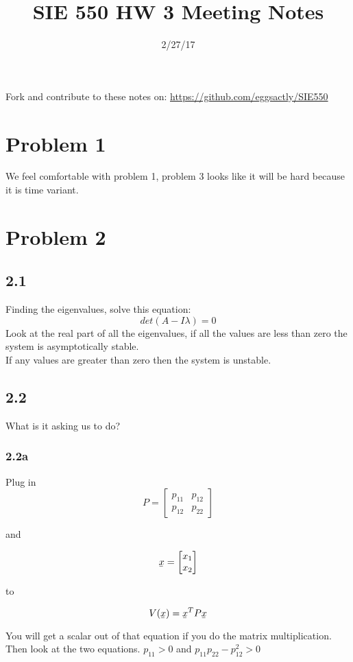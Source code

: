 \documentclass[12pt]{article}
\newcommand{\ubar}[1]{\underaccent{\bar}{#1}}
\begin{document}
\title{SIE 550 HW 3 Meeting Notes}
\date{2/27/17}

\maketitle

Fork and contribute to these notes on: \url{https://github.com/eggsactly/SIE550}

\section*{Problem 1} 
We feel comfortable with problem 1, problem 3 looks like it will be hard because it is time variant. 

\section*{Problem 2} 
\subsection*{2.1}
Finding the eigenvalues, solve this equation:
$$det(A-I\lambda)=0$$
Look at the real part of all the eigenvalues, if all the values are less than zero the system is asymptotically stable.\\
If any values are greater than zero then the system is unstable. 

\subsection*{2.2}
What is it asking us to do?

\subsubsection*{2.2a}
Plug in 
$$P=\begin{bmatrix} p_{11} & p_{12} \\
p_{12} & p_{22}
\end{bmatrix}$$ 

and 

$$\ubar{x}=\begin{bmatrix} x_{1} \\
x_{2}
\end{bmatrix}$$ 

to

$$V(\ubar{x})=\ubar{x}^TP\ubar{x}$$

You will get a scalar out of that equation if you do the matrix multiplication. Then look at the two equations. 
$p_{11}>0$ 
and
$p_{11}p_{22}-p_{12}^2>0$ \\
\end{document}
